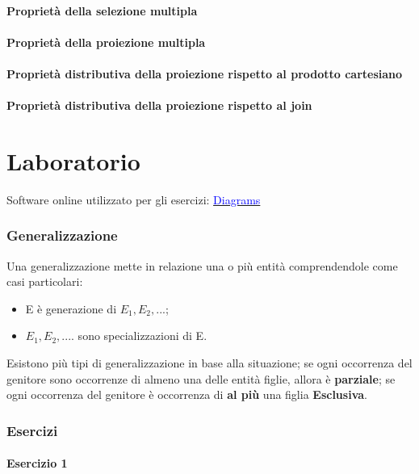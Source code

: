 \documentclass[10pt,twocolumn]{article}
\begin{document}
\subsection{Proprietà della selezione multipla}
\subsection{Proprietà della proiezione multipla}
\subsection{Proprietà distributiva della proiezione rispetto al prodotto cartesiano}
\subsection{Proprietà distributiva della proiezione rispetto al join}











\clearpage
  \part{ Laboratorio}
  Software online utilizzato per gli esercizi: \hyperlink{https://www.diagrams.net/}{\textcolor{blue}{Diagrams}}
\section{Generalizzazione}
Una generalizzazione mette in relazione una o più entità comprendendole come casi particolari: \begin{itemize}
    \item E è generazione di $E_1,E_2,...$;
    \item $E_1,E_2,....$ sono specializzazioni di E.
\end{itemize}
Esistono più tipi di generalizzazione in base alla situazione; se ogni occorrenza del genitore sono occorrenze di almeno una delle entità figlie, allora è \textbf{parziale}; se ogni occorrenza del genitore è occorrenza di \textbf{al più} una figlia \textbf{Esclusiva}.
\onecolumn
\section{Esercizi}
\subsection{Esercizio 1}
\end{document}
